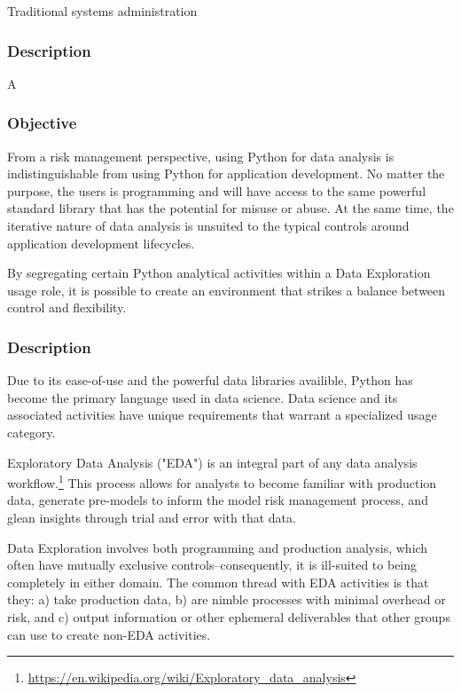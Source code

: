 			Traditional systems administration 

		\subsubsection{Description}

			A



		\subsubsection{Objective}

			From a risk management perspective, using Python for data analysis is indistinguishable from using Python for application development. No matter the purpose, the users is programming and will have access to the same powerful standard library that has the potential for misuse or abuse. At the same time, the iterative nature of data analysis is unsuited to the typical controls around application development lifecycles. 

			By segregating certain Python analytical activities within a Data Exploration usage role, it is possible to create an environment that strikes a balance between control and flexibility.

		\subsubsection{Description}

			Due to its ease-of-use and the powerful data libraries availible, Python has become the primary language used in data science. Data science and its associated activities have unique requirements that warrant a specialized usage category. 

			Exploratory Data Analysis ("EDA") is an integral part of any data analysis workflow.\footnote{\url{https://en.wikipedia.org/wiki/Exploratory_data_analysis}} This process allows for analysts to become familiar with production data, generate pre-models to inform the model risk management process, and glean insights through trial and error with that data. 

			Data Exploration involves both programming and production analysis, which often have mutually exclusive controls--consequently, it is ill-suited to being completely in either domain. The common thread with EDA activities is that they: a) take production data, b) are nimble processes with minimal overhead or risk, and c) output information or other ephemeral deliverables that other groups can use to create non-EDA activities.











